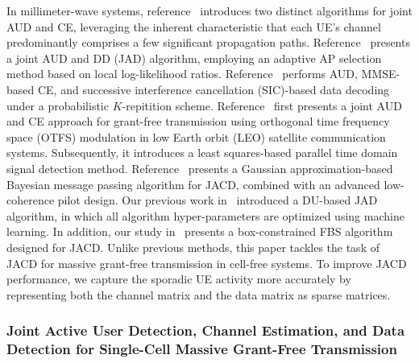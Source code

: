 %
In millimeter-wave systems, reference~\cite{Johnston2022model} introduces two distinct algorithms for joint AUD and CE, leveraging the inherent characteristic that each UE's channel predominantly comprises a few significant propagation paths.
%
Reference~\cite{Di2022adaptive} presents a joint AUD and DD (JAD) algorithm, employing an adaptive AP selection method based on local log-likelihood ratios.
%
Reference~\cite{Femenias2023repetition} performs AUD, MMSE-based CE, and successive interference cancellation (SIC)-based data decoding under a probabilistic $K$-repitition scheme.
%
Reference~\cite{zhou2023active} first presents a joint AUD and CE approach for grant-free transmission using orthogonal time frequency space (OTFS) modulation in low Earth orbit (LEO) satellite communication systems. 
Subsequently, it introduces a least squares-based parallel time domain signal detection method.
%
Reference~\cite{Iimori2021grant} presents a Gaussian approximation-based Bayesian message passing algorithm for JACD, combined with an advanced low-coherence pilot design. 
%
Our previous work in~\cite{sun2023deep_unfolding} introduced a DU-based JAD algorithm, in which all algorithm hyper-parameters are optimized using machine learning. 
%
In addition, our study in~\cite{sun2023joint_arxiv} presents a box-constrained FBS algorithm designed for JACD.
%
Unlike previous methods, this paper tackles the task of JACD for massive grant-free transmission in cell-free systems. 
%
To improve JACD performance, we capture the sporadic UE activity more accurately by representing both the channel matrix and the data matrix as sparse matrices.


\subsubsection{Joint Active User Detection, Channel Estimation, and Data Detection for Single-Cell Massive Grant-Free Transmission}

